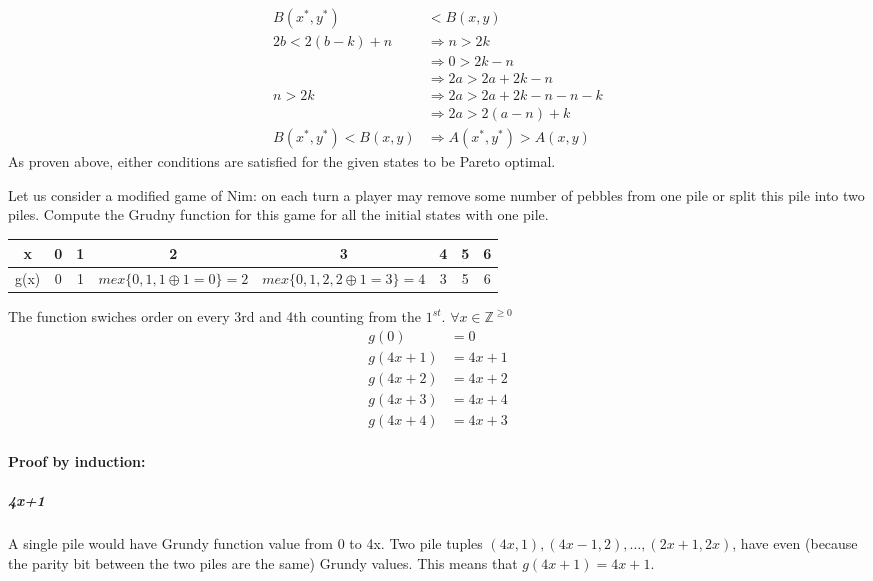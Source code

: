 \documentclass[addpoints,answers]{exam}
\begin{document}
\begin{questions}
\begin{solutionorbox}[\stretch{1}]
\begin{align*}
							B(x^*, y^*) &< B(x, y)\\
							2b < 2(b-k) + n &\Rightarrow n>2k\\
															&\Rightarrow 0 > 2k -n\\
															&\Rightarrow 2a > 2a + 2k -n\\
												 n>2k	&\Rightarrow 2a > 2a + 2k -n -n - k\\
														  &\Rightarrow 2a > 2(a-n) + k\\
							B(x^*, y^*) < B(x, y)&\Rightarrow A(x^*, y^*) > A(x,y)
						\end{align*}
						As proven above, either conditions are satisfied for the given
						states to be Pareto optimal.
						
            \end{solutionorbox}
            \newpage
 
        \question
            Let us consider a modified game of Nim: on each turn a player may remove some
            number of pebbles from one pile or split this pile into two piles. Compute the
            Grudny function for this game for all the initial states with one pile.
            \begin{solutionorbox}[\stretch{1}]

							\begin{center}
							\begin{tabular}{c||c|c|c|c|c|c|c}
								x & 0 & 1 & 2 & 3 & 4 & 5 & 6\\
								\hline
								g(x) & 0 & 1 & $mex\{0, 1, 1\oplus 1=0 \}=2$ & $mex\{0, 1, 2,
								2\oplus 1=3 \}=4$ & 3 & 5 & 6
							\end{tabular}
							\end{center}
							The function swiches order on every 3rd and 4th counting from the
							$1^{st}$. $\forall x \in \mathbb{Z}^{\ge 0}$
							\begin{align*}
							g(0) &= 0\\
							g(4x+1) &= 4x+1\\
							g(4x+2) &= 4x+2\\
							g(4x+3) &= 4x+4\\
							g(4x+4) &= 4x+3
							\end{align*}
							\paragraph{Proof by induction:}
								\subparagraph{4x+1}A single pile would have Grundy function
								value from 0 to 4x. Two pile tuples $(4x, 1),
								(4x-1,2),\dots,(2x+1, 2x)$, have even (because the parity bit
								between the two piles are the same) Grundy values. This means
								that $g(4x+1) = 4x+1$.


\end{solutionorbox}
\end{questions}
\end{document}
